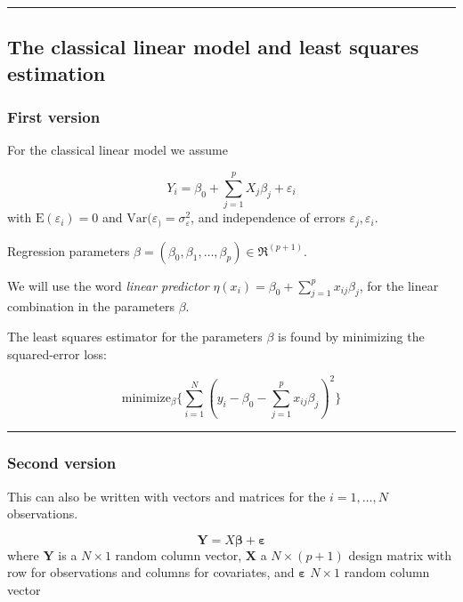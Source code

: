 \documentclass[
  letterpaper,
  DIV=11,
  numbers=noendperiod]{scrartcl}
\begin{document}
\begin{center}\rule{0.5\linewidth}{0.5pt}\end{center}

\hypertarget{the-classical-linear-model-and-least-squares-estimation}{%
\subsection{The classical linear model and least squares
estimation}\label{the-classical-linear-model-and-least-squares-estimation}}

\hypertarget{first-version}{%
\subsubsection{First version}\label{first-version}}

For the classical linear model we assume

\[ Y_i=\beta_0+\sum_{j=1}^p X_{j}\beta_j+\varepsilon_i\] with
\(\text{E}(\varepsilon_i)=0\) and
\(\text{Var}(\varepsilon_)=\sigma^2_{\varepsilon}\), and independence of
errors \(\varepsilon_j,\varepsilon_i\).

Regression parameters
\(\beta=(\beta_0,\beta_1,\ldots,\beta_p)\in \Re^{(p+1)}\).

We will use the word \emph{linear predictor}
\(\eta(x_i)=\beta_0+\sum_{j=1}^p x_{ij}\beta_j\), for the linear
combination in the parameters \(\beta\).

The least squares estimator for the parameters \(\beta\) is found by
minimizing the squared-error loss:

\[ \text{minimize}_{\beta} \{ \sum_{i=1}^N (y_i-\beta_0-\sum_{j=1}^p x_{ij}\beta_j)^2\}\]

\begin{center}\rule{0.5\linewidth}{0.5pt}\end{center}

\hypertarget{second-version}{%
\subsubsection{Second version}\label{second-version}}

This can also be written with vectors and matrices for the
\(i=1,\ldots,N\) observations.

\[{\mathbf Y=X \boldsymbol{\beta}}+{\mathbf\varepsilon}\] where
\({\mathbf Y}\) is a \(N \times 1\) random column vector,
\({\mathbf X}\) a \(N \times (p+1)\) design matrix with row for
observations and columns for covariates, and \({\mathbf{\varepsilon}}\)
\(N \times 1\) random column vector
\end{document}
